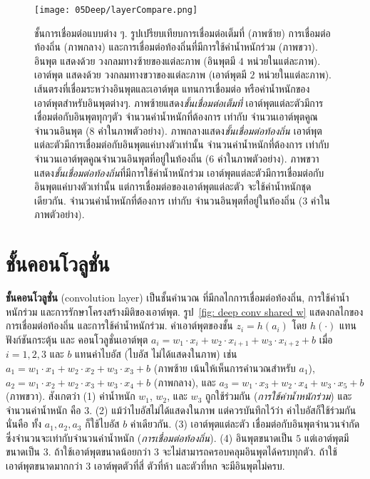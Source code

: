 %
\begin{figure}
	\begin{center}
		\texttt{[image: 05Deep/layerCompare.png]}
		\caption[ชั้นการเชื่อมต่อแบบต่าง ๆ]{ชั้นการเชื่อมต่อแบบต่าง ๆ.
รูปเปรียบเทียบการเชื่อมต่อเต็มที่ (ภาพซ้าย) การเชื่อมต่อท้องถิ่น (ภาพกลาง) และการเชื่อมต่อท้องถิ่นที่มีการใช้ค่าน้ำหนักร่วม (ภาพขวา). 
			อินพุต แสดงด้วย วงกลมทางซ้ายของแต่ละภาพ (อินพุตมี $4$ หน่วยในแต่ละภาพ).
			เอาต์พุต แสดงด้วย วงกลมทางขวาของแต่ละภาพ (เอาต์พุตมี $2$ หน่วยในแต่ละภาพ).
			เส้นตรงที่เชื่อมระหว่างอินพุตและเอาต์พุต แทนการเชื่อมต่อ หรือค่าน้ำหนักของเอาต์พุตสำหรับอินพุตต่างๆ.
			ภาพซ้ายแสดง\textit{ชั้นเชื่อมต่อเต็มที่} เอาต์พุตแต่ละตัวมีการเชื่อมต่อกับอินพุตทุกๆตัว จำนวนค่าน้ำหนักที่ต้องการ เท่ากับ จำนวนเอาต์พุตคูณจำนวนอินพุต ($8$ ค่าในภาพตัวอย่าง).
			ภาพกลางแสดง\textit{ชั้นเชื่อมต่อท้องถิ่น} เอาต์พุตแต่ละตัวมีการเชื่อมต่อกับอินพุตแค่บางตัวเท่านั้น
			จำนวนค่าน้ำหนักที่ต้องการ เท่ากับ จำนวนเอาต์พุตคูณจำนวนอินพุตที่อยู่ในท้องถิ่น ($6$ ค่าในภาพตัวอย่าง).
			ภาพขวาแสดง\textit{ชั้นเชื่อมต่อท้องถิ่น}ที่มีการใช้ค่าน้ำหนักร่วม เอาต์พุตแต่ละตัวมีการเชื่อมต่อกับอินพุตแค่บางตัวเท่านั้น แต่การเชื่อมต่อของเอาต์พุตแต่ละตัว จะใช้ค่าน้ำหนักชุดเดียวกัน.
			จำนวนค่าน้ำหนักที่ต้องการ เท่ากับ จำนวนอินพุตที่อยู่ในท้องถิ่น ($3$ ค่าในภาพตัวอย่าง).
		}
		\label{fig: deep fully locally and weight sharing}
	\end{center}
\end{figure}
%

\section{ชั้นคอนโวลูชั่น} 
\label{sec: convolution layer}
\textbf{ชั้นคอนโวลูชั่น} (convolution layer)
เป็นชั้นคำนวณ
ที่มีกลไกการเชื่อมต่อท้องถิ่น,
การใช้ค่าน้ำหนักร่วม และการรักษาโครงสร้างมิติของเอาต์พุต. 
รูป~\ref{fig: deep conv shared w} แสดงกลไกของการเชื่อมต่อท้องถิ่น และการใช้ค่าน้ำหนักร่วม.
ค่าเอาต์พุตของชั้น $z_i = h(a_i)$
โดย $h(\cdot)$ แทนฟังก์ชันกระตุ้น
และ 
คอนโวลูชั่นเอาต์พุต
$a_i = w_1 \cdot x_{i} + w_2 \cdot x_{i+1} + w_3 \cdot x_{i+2} + b$ เมื่อ $i = 1, 2, 3$ และ $b$ แทนค่าไบอัส (ไบอัส ไม่ได้แสดงในภาพ)
เช่น
$a_1 = w_1 \cdot x_1 + w_2 \cdot x_2 + w_3 \cdot x_3 + b$ (ภาพซ้าย เน้นให้เห็นการคำนวณสำหรับ $a_1$),
$a_2 = w_1 \cdot x_2 + w_2 \cdot x_3 + w_3 \cdot x_4 + b$ (ภาพกลาง),
และ
$a_3 = w_1 \cdot x_3 + w_2 \cdot x_4 + w_3 \cdot x_5 + b$ (ภาพขวา).
สังเกตว่า
(1) ค่าน้ำหนัก $w_1$, $w_2$, และ $w_3$ ถูกใช้ร่วมกัน (\textit{การใช้ค่าน้ำหนักร่วม})
และจำนวนค่าน้ำหนัก คือ $3$.
(2) แม้ว่าไบอัสไม่ได้แสดงในภาพ แต่ควรบันทึกไว้ว่า ค่าไบอัสก็ใช้ร่วมกัน นั่นคือ ทั้ง $a_1, a_2, a_3$ ก็ใช้ไบอัส $b$ ค่าเดียวกัน.
(3) เอาต์พุตแต่ละตัว เชื่อมต่อกับอินพุตจำนวนจำกัด ซึ่งจำนวนจะเท่ากับจำนวนค่าน้ำหนัก (\textit{การเชื่อมต่อท้องถิ่น}).
(4) อินพุตขนาดเป็น $5$ แต่เอาต์พุตมีขนาดเป็น $3$.
ถ้าใช้เอาต์พุตขนาดน้อยกว่า $3$ จะไม่สามารถครอบคลุมอินพุตได้ครบทุกตัว.
ถ้าใช้เอาต์พุตขนาดมากกว่า $3$ 
เอาต์พุตตัวที่สี่ ตัวที่ห้า และตัวที่หก จะมีอินพุตไม่ครบ.

